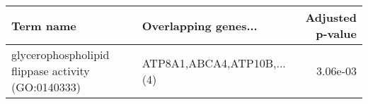 \begin{tabular}{llr}
\toprule
                                         Term name &       Overlapping genes... &  Adjusted p-value \\
\midrule
glycerophospholipid flippase activity (GO:0140333) & ATP8A1,ABCA4,ATP10B,...(4) &          3.06e-03 \\
\bottomrule
\end{tabular}
